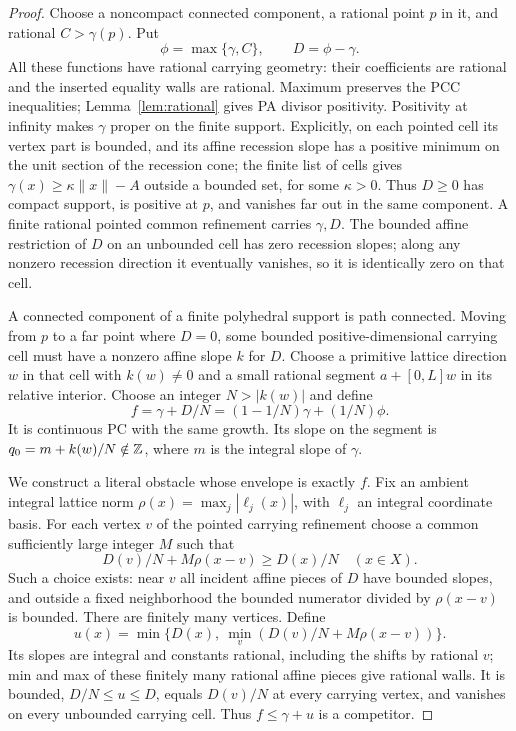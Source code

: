 \documentclass[11pt]{article}
\theoremstyle{definition}\newtheorem{definition}[theorem]{Definition}
\theoremstyle{remark}\newtheorem{remark}[theorem]{Remark}
\begin{document}
\begin{proof}
Choose a noncompact connected component, a rational point $p$ in it, and rational $C>\gamma(p)$. Put
\[
 \phi=\max\{\gamma,C\},\qquad D=\phi-\gamma.
\]
All these functions have rational carrying geometry: their coefficients are rational and the inserted equality walls are rational. Maximum preserves the PCC inequalities; Lemma~\ref{lem:rational} gives PA divisor positivity. Positivity at infinity makes $\gamma$ proper on the finite support. Explicitly, on each pointed cell its vertex part is bounded, and its affine recession slope has a positive minimum on the unit section of the recession cone; the finite list of cells gives $\gamma(x)\geq\kappa\|x\|-A$ outside a bounded set, for some $\kappa>0$. Thus $D\geq0$ has compact support, is positive at $p$, and vanishes far out in the same component. A finite rational pointed common refinement carries $\gamma,D$. The bounded affine restriction of $D$ on an unbounded cell has zero recession slopes; along any nonzero recession direction it eventually vanishes, so it is identically zero on that cell.

A connected component of a finite polyhedral support is path connected. Moving from $p$ to a far point where $D=0$, some bounded positive-dimensional carrying cell must have a nonzero affine slope $k$ for $D$. Choose a primitive lattice direction $w$ in that cell with $k(w)\ne0$ and a small rational segment $a+[0,L]w$ in its relative interior. Choose an integer $N>|k(w)|$ and define
\[
 f=\gamma+D/N=(1-1/N)\gamma+(1/N)\phi.
\]
It is continuous PC with the same growth. Its slope on the segment is $q_0=m+k(w)/N\notin\mathbb Z$, where $m$ is the integral slope of $\gamma$.

We construct a literal obstacle whose envelope is exactly $f$. Fix an ambient integral lattice norm $\rho(x)=\max_j|\ell_j(x)|$, with $\ell_j$ an integral coordinate basis. For each vertex $v$ of the pointed carrying refinement choose a common sufficiently large integer $M$ such that
\[
 D(v)/N+M\rho(x-v)\geq D(x)/N\quad(x\in X).
\]
Such a choice exists: near $v$ all incident affine pieces of $D$ have bounded slopes, and outside a fixed neighborhood the bounded numerator divided by $\rho(x-v)$ is bounded. There are finitely many vertices. Define
\[
 u(x)=\min\bigl\{D(x),\ \min_v(D(v)/N+M\rho(x-v))\bigr\}.
\]
Its slopes are integral and constants rational, including the shifts by rational $v$; min and max of these finitely many rational affine pieces give rational walls. It is bounded, $D/N\leq u\leq D$, equals $D(v)/N$ at every carrying vertex, and vanishes on every unbounded carrying cell. Thus $f\leq\gamma+u$ is a competitor.


\end{proof}
\end{document}
